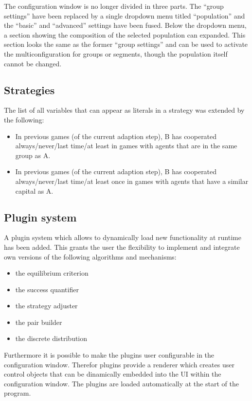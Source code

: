 \documentclass[parskip=full,11pt]{scrartcl}
\begin{document}
The configuration window is no longer divided in three parts. The \enquote{group settings} have been replaced by a single dropdown menu titled \enquote{population} and the \enquote{basic} and \enquote{advanced} settings have been fused. Below the dropdown menu, a section showing the composition of the selected population can expanded. This section looks the same as the former \enquote{group settings} and can be used to activate the multiconfiguration for groups or segments, though the population itself cannot be changed.

\subsection{Strategies}
The list of all variables that can appear as literals in a strategy was extended by the following:
\begin{itemize}
\item In previous games (of the current adaption step), B has cooperated always/never/last time/at least in games with agents that are in the same group as A.
\item In previous games (of the current adaption step), B has cooperated always/never/last time/at least once in games with agents that have a similar capital as A.
\end{itemize}

\subsection{Plugin system}

A plugin system which allows to dynamically load new functionality at runtime has been added. This grants the user the flexibility to implement and integrate own versions of the following algorithms and mechanisms:
\begin{itemize} \itemsep -10pt
	\item the equilibrium criterion
	\item the success quantifier
	\item the strategy adjuster
	\item the pair builder
	\item the discrete distribution
\end{itemize}

Furthermore it is possible to make the plugins user configurable in the configuration window. Therefor plugins provide a renderer which creates user control objects that can be dinamically embedded into the UI within the configuration window. The plugins are loaded automatically at the start of the program.
\end{document}

